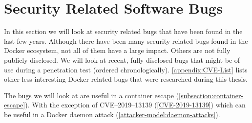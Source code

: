 \section{Security Related Software Bugs}\label{section:bugs}
In this section we will look at security related bugs that have been found in the last few years. Although there have been many security related bugs found in the Docker ecosystem, not all of them have a large impact. Others are not fully publicly disclosed. We will look at recent, fully disclosed bugs that might be of use during a penetration test (ordered chronologically). \autoref{appendix:CVE-List} lists other less interesting Docker related bugs that were researched during this thesis.

The bugs we will look at are useful in a container escape (\autoref{subsection:container-escape}). With the exception of CVE--2019--13139 (\autoref{CVE-2019-13139}) which can be useful in a Docker daemon attack (\autoref{attacker-model:daemon-attacks}).








